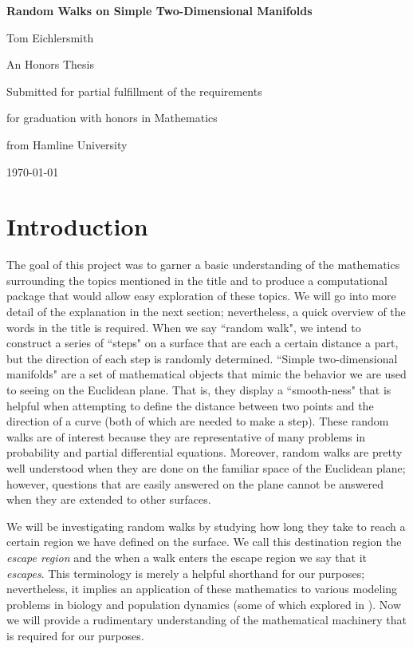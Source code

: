 \documentclass{article}
\begin{document}
\begin{titlepage}
	\centering
	\vspace*{\fill}
	{\LARGE\bfseries Random Walks on Simple Two-Dimensional Manifolds\par}
	\vspace{5cm}
	{\large Tom Eichlersmith\par}
	\vspace{5cm}
	An Honors Thesis\par
	Submitted for partial fulfillment of the requirements\par
	for graduation with honors in Mathematics\par
	from Hamline University\par
	\vspace{1em}
	{\today\par}
	\vspace*{\fill}
\end{titlepage}

\section{Introduction}
	The goal of this project was to garner a basic understanding of the mathematics surrounding the topics mentioned in the title and to produce a computational package that would allow easy exploration of these topics.
	We will go into more detail of the explanation in the next section; nevertheless, a quick overview of the words in the title is required.
	When we say ``random walk", we intend to construct a series of ``steps" on a surface that are each a certain distance a part, but the direction of each step is randomly determined.
	``Simple two-dimensional manifolds" are a set of mathematical objects that mimic the behavior we are used to seeing on the Euclidean plane.
	That is, they display a ``smooth-ness" that is helpful when attempting to define the distance between two points and the direction of a curve (both of which are needed to make a step).
	These random walks are of interest because they are representative of many problems in probability and partial differential equations.
	Moreover, random walks are pretty well understood when they are done on the familiar space of the Euclidean plane; however, questions that are easily answered on the plane cannot be answered when they are extended to other surfaces.
	
	We will be investigating random walks by studying how long they take to reach a certain region we have defined on the surface.
	We call this destination region the \emph{escape region} and the when a walk enters the escape region we say that it \emph{escapes}.
	This terminology is merely a helpful shorthand for our purposes; nevertheless, it implies an application of these mathematics to various modeling problems in biology and population dynamics (some of which explored in \cite{Codling_WalksBiology_2008}).
	Now we will provide a rudimentary understanding of the mathematical machinery that is required for our purposes.
\end{document}
